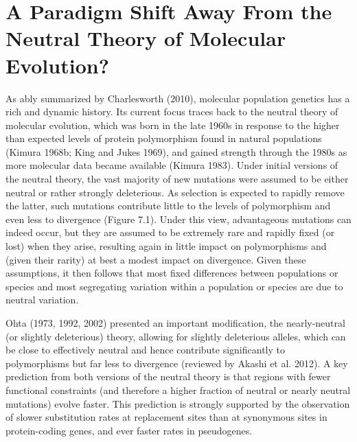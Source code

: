 \documentclass{article}
\begin{document}
\section{A Paradigm Shift Away From the Neutral Theory of Molecular Evolution?}
As ably summarized by Charlesworth (2010), molecular population genetics has a rich and dynamic history. Its current focus traces back to the neutral theory of molecular evolution, which was born in the late 1960s in response to the higher than expected levels of protein polymorphism found in natural populations (Kimura 1968b; King and Jukes 1969), and gained strength through the 1980s as more molecular data became available (Kimura 1983). Under initial versions of the neutral theory, the vast majority of new mutations were assumed to be either neutral or rather strongly deleterious. As selection is expected to rapidly remove the latter, such mutations contribute little to the levels of polymorphism and even less to divergence (Figure 7.1). Under this view, advantageous mutations can indeed occur, but they are assumed to be extremely rare and rapidly fixed (or lost) when they arise, resulting again in little impact on polymorphisms and (given their rarity) at best a modest impact on divergence. Given these assumptions, it then follows that most fixed differences between populations or species and most segregating variation within a population or species are due to neutral variation.

Ohta (1973, 1992, 2002) presented an important modification, the nearly-neutral (or slightly deleterious) theory, allowing for slightly deleterious alleles, which can be close to effectively neutral and hence contribute significantly to polymorphisms but far less to divergence (reviewed by Akashi et al. 2012). A key prediction from both versions of the neutral theory is that regions with fewer functional constraints (and therefore a higher fraction of neutral or nearly neutral mutations) evolve faster. This prediction is strongly supported by the observation of slower substitution rates at replacement sites than at synonymous sites in protein-coding genes, and ever faster rates in pseudogenes.
\end{document}
